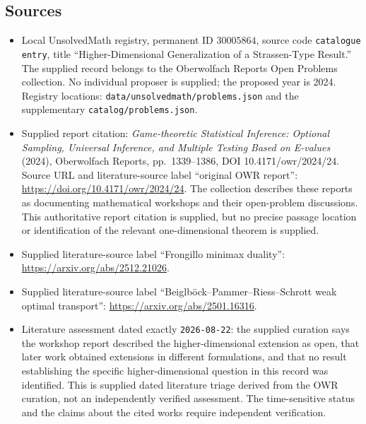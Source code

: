 \documentclass[11pt]{article}
\begin{document}
\subsection{Sources}
\begin{itemize}
\item Local UnsolvedMath registry, permanent ID \(30005864\), source code \texttt{catalogue entry}, title ``Higher-Dimensional Generalization of a Strassen-Type Result.'' The supplied record belongs to the Oberwolfach Reports Open Problems collection. No individual proposer is supplied; the proposed year is 2024. Registry locations: \texttt{data/unsolvedmath/problems.json} and the supplementary \texttt{catalog/problems.json}.
\item Supplied report citation: \emph{Game-theoretic Statistical Inference: Optional Sampling, Universal Inference, and Multiple Testing Based on E-values} (2024), Oberwolfach Reports, pp.\ 1339--1386, DOI 10.4171/owr/2024/24. Source URL and literature-source label ``original OWR report'': \url{https://doi.org/10.4171/owr/2024/24}. The collection describes these reports as documenting mathematical workshops and their open-problem discussions. This authoritative report citation is supplied, but no precise passage location or identification of the relevant one-dimensional theorem is supplied.
\item Supplied literature-source label ``Frongillo minimax duality'': \url{https://arxiv.org/abs/2512.21026}.
\item Supplied literature-source label ``Beiglb\"ock--Pammer--Riess--Schrott weak optimal transport'': \url{https://arxiv.org/abs/2501.16316}.
\item Literature assessment dated exactly \texttt{2026-08-22}: the supplied curation says the workshop report described the higher-dimensional extension as open, that later work obtained extensions in different formulations, and that no result establishing the specific higher-dimensional question in this record was identified. This is supplied dated literature triage derived from the OWR curation, not an independently verified assessment. The time-sensitive status and the claims about the cited works require independent verification.
\end{itemize}
\end{document}
